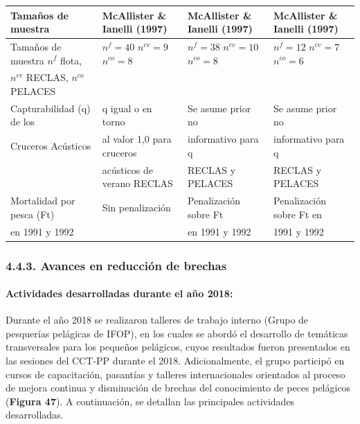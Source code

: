 \documentclass[
  spanish,
]{article}
\begin{document}
\begin{table}[h]
{\begin{tabular}{|l|l|l|l|}
 Tamaños de muestra            & McAllister \& Ianelli (1997) & McAllister \& Ianelli (1997) & McAllister \& Ianelli (1997)\\ \hline
 Tamaños de muestra $n^f$ flota,& $n^f=40$ $n^{cv}=9$ $n^{co}=8$& $n^f=38$ $n^{cv}=10$ $n^{co}=8$& $n^f=12$ $n^{cv}=7$ $n^{co}=6$ \\ 
  $n^{cv}$ RECLAS, $n^{co}$ PELACES&                             &                             &   \\ \hline
 Capturabilidad (q) de los     & q igual o en torno          & Se asume prior no           & Se asume prior no \\
 Cruceros Acústicos            & al valor 1,0 para cruceros  & informativo para q          & informativo para q  \\
                               & acústicos de verano RECLAS  & RECLAS y PELACES            & RECLAS y PELACES \\ \hline
 Mortalidad por pesca (Ft)     & Sin penalización            & Penalización sobre Ft       & Penalización sobre Ft en \\
 en 1991 y 1992                &                             & en 1991 y 1992              & 1991 y 1992 \\ \hline  
  \end{tabular}}
    \end{table}

\normalsize

\hypertarget{avances-en-reducciuxf3n-de-brechas}{%
\subsubsection{4.4.3. Avances en reducción de
brechas}\label{avances-en-reducciuxf3n-de-brechas}}

\hypertarget{actividades-desarrolladas-durante-el-auxf1o-2018}{%
\paragraph{Actividades desarrolladas durante el año
2018:}\label{actividades-desarrolladas-durante-el-auxf1o-2018}}

Durante el año 2018 se realizaron talleres de trabajo interno (Grupo de
pesquerías pelágicas de IFOP), en los cuales se abordó el desarrollo de
temáticas transversales para los pequeños pelágicos, cuyos resultados
fueron presentados en las sesiones del CCT-PP durante el 2018.
Adicionalmente, el grupo participó en cursos de capacitación, pasantías
y talleres internacionales orientados al proceso de mejora continua y
disminución de brechas del conocimiento de peces pelágicos
(\textbf{Figura 47}). A continuación, se detallan las principales
actividades desarrolladas.
\end{document}
